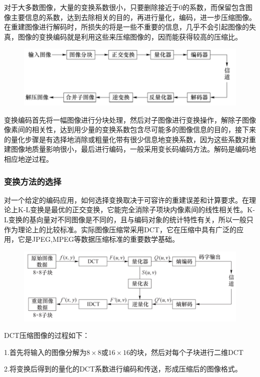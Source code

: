 \documentclass[11pt]{article}
\begin{document}
对于大多数图像，大量的变换系数很小，只要删除接近于0的系数，而保留包含图像主要信息的系数，达到去除相关的目的，再进行量化，编码，进一步压缩图像。在重建图像进行解码时，所损失的将是一些不重要的信息，几乎不会引起图像的失真，图像的变换编码就是利用这些来压缩图像的，因而能获得较高的压缩比。

\begin{figure}[H]
	\centering
	\includegraphics[scale=0.6]{44}
\end{figure}

变换编码首先将一幅图像进行分块处理，然后对子图像进行变换操作，解除子图像像素间的相关性，达到用少量的变换系数包含尽可能多的图像信息的目的，接下来的量化步骤是有选择地消除或粗量化带有很少信息地变换系数，因为这些系数对重建图像地质量影响很小，最后进行编码，一般采用变长码编码方法。解码是编码地相应地逆过程。
\subsubsection{变换方法的选择}
对一个给定的编码应用，如何选择变换取决于可容许的重建误差和计算要求。在理论上K-L变换是最优的正交变换，它能完全消除子项块内像素间的线性相关性。K-L变换的基向量对不同图像是不同的，且与编码对象的统计特性有关，所以一般只作为理论上的比较标准。实际图像压缩常采用DCT，它在压缩中具有广泛的应用，它是JPEG,MPEG等数据压缩标准的重要数学基础。

\begin{figure}[H]
	\centering
	\includegraphics[scale=0.6]{45}
\end{figure}

DCT压缩图像的过程如下：

\noindent1.首先将输入的图像分解为$8\times 8$或$16\times 16$的块，然后对每个子块进行二维DCT

\noindent2.将变换后得到的量化的DCT系数进行编码和传送，形成压缩后的图像格式。
\end{document}
